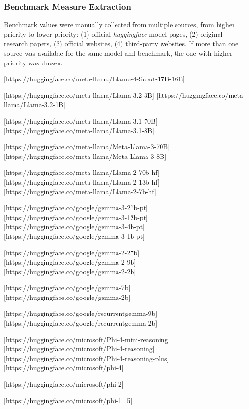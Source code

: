     \subsubsection{Benchmark Measure Extraction}

        Benchmark values were manually collected from multiple sources, from higher priority to lower priority: (1) official \textit{huggingface} model pages, (2) original research papers, (3) official websites, (4) third-party websites. If more than one source was available for the same model and benchmark, the one with higher priority was chosen.

        [https://huggingface.co/meta-llama/Llama-4-Scout-17B-16E]

        [https://huggingface.co/meta-llama/Llama-3.2-3B]
        [https://huggingface.co/meta-llama/Llama-3.2-1B]

        [https://huggingface.co/meta-llama/Llama-3.1-70B]
        [https://huggingface.co/meta-llama/Llama-3.1-8B]

        [https://huggingface.co/meta-llama/Meta-Llama-3-70B]
        [https://huggingface.co/meta-llama/Meta-Llama-3-8B]

        [https://huggingface.co/meta-llama/Llama-2-70b-hf]
        [https://huggingface.co/meta-llama/Llama-2-13b-hf]
        [https://huggingface.co/meta-llama/Llama-2-7b-hf]


        [https://huggingface.co/google/gemma-3-27b-pt]
        [https://huggingface.co/google/gemma-3-12b-pt]
        [https://huggingface.co/google/gemma-3-4b-pt]
        [https://huggingface.co/google/gemma-3-1b-pt]

        [https://huggingface.co/google/gemma-2-27b]
        [https://huggingface.co/google/gemma-2-9b]
        [https://huggingface.co/google/gemma-2-2b]

        [https://huggingface.co/google/gemma-7b]
        [https://huggingface.co/google/gemma-2b]

        [https://huggingface.co/google/recurrentgemma-9b]
        [https://huggingface.co/google/recurrentgemma-2b]


        [https://huggingface.co/microsoft/Phi-4-mini-reasoning]
        [https://huggingface.co/microsoft/Phi-4-reasoning]
        [https://huggingface.co/microsoft/Phi-4-reasoning-plus]
        [https://huggingface.co/microsoft/phi-4]

        [https://huggingface.co/microsoft/phi-2]

        [\url{https://huggingface.co/microsoft/phi-1_5}]

